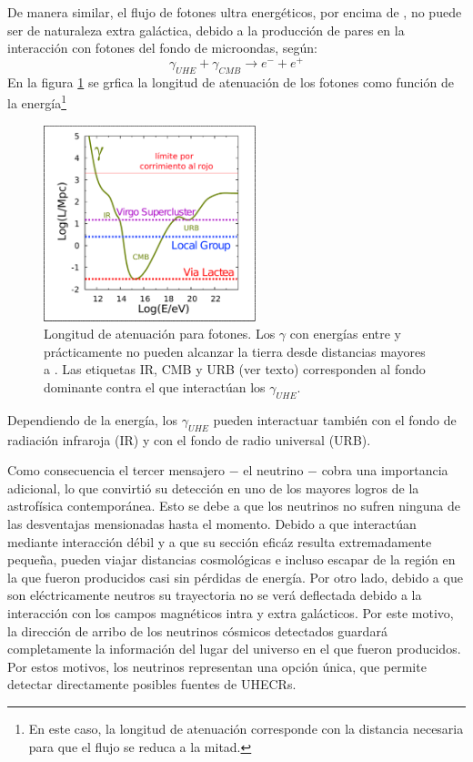 De manera similar, el flujo de fotones ultra energ\'eticos, por encima de , no puede ser de naturaleza extra gal\'actica, debido a la producci\'on de pares en la interacci\'on con fotones del fondo de microondas, seg\'un\cite{cite:photonInt1,cite:photonInt2}:
%
\begin{equation}
\gamma_{UHE} + \gamma_{CMB} \rightarrow e^- + e^+
\end{equation}
%
En la figura \ref{fig:photProp} se grfica la longitud de atenuaci\'on de los fotones como funci\'on de la energ\'ia\footnote{En este caso, la longitud de atenuaci\'on corresponde con la distancia necesaria para que el flujo se reduca a la mitad.}
%
\begin{figure}[ht]
	\begin{center}
	\includegraphics[width=0.55\textwidth]{fig/introduccion/photon_propaga_espanol}
	\caption{\label{fig:photProp} Longitud de atenuaci\'on para fotones. Los $\gamma$ con energ\'ias entre  y  pr\'acticamente no pueden alcanzar la tierra desde distancias mayores a . Las etiquetas IR, CMB y URB (ver texto) corresponden al fondo dominante contra el que interact\'uan los $\gamma_{UHE}$.}
	\end{center}
\end{figure}
%
Dependiendo de la energ\'ia, los $\gamma_{UHE}$ pueden interactuar tambi\'en con el fondo de radiaci\'on infraroja (IR)\cite{cite:IR} y con el fondo de radio universal (URB)\cite{cite:URB}.

Como consecuencia el tercer mensajero $-$ el neutrino $-$ cobra una importancia adicional, lo que convirti\'o su detecci\'on en uno de los mayores logros de la astrof\'isica contempor\'anea.
Esto se debe a que los neutrinos no sufren ninguna de las desventajas mensionadas hasta el momento. 
Debido a que interact\'uan mediante interacci\'on d\'ebil y a que su secci\'on efic\'az resulta extremadamente peque\~na, pueden viajar distancias cosmol\'ogicas e incluso escapar de la regi\'on en la que fueron producidos casi sin p\'erdidas de energ\'ia.
Por otro lado, debido a que son el\'ectricamente neutros su trayectoria no se ver\'a deflectada debido a la interacci\'on con los campos magn\'eticos intra y extra gal\'acticos.
Por este motivo, la direcci\'on de arribo de los neutrinos c\'osmicos detectados guardar\'a completamente la informaci\'on del lugar del universo en el que fueron producidos.
Por estos motivos, los neutrinos representan una opci\'on \'unica, que permite detectar directamente posibles fuentes de UHECRs.

